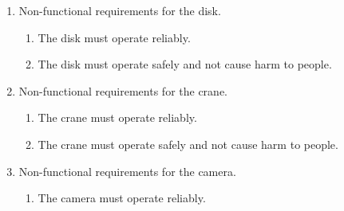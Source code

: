 \begin{enumerate}
    \item Non-functional requirements for the disk.
    \begin{enumerate}
        \item The disk must operate reliably.
        \item The disk must operate safely and not cause harm to people.
    \end{enumerate}
    \vspace{1em}
    
    \item Non-functional requirements for the crane.
    \begin{enumerate}
        \item The crane must operate reliably.
        \item The crane must operate safely and not cause harm to people.
    \end{enumerate}
    \vspace{1em}
    
    \item Non-functional requirements for the camera.
    \begin{enumerate}
        \item The camera must operate reliably.
    \end{enumerate}
\end{enumerate}

